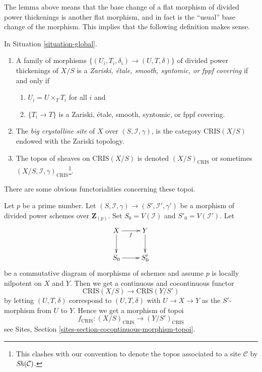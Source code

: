 \noindent
The lemma above means that the base change of a flat morphism
of divided power thickenings is another flat morphism, and in
fact is the ``usual'' base change of the morphism. This implies
that the following definition makes sense.

\begin{definition}
\label{definition-big-crystalline-site}
In Situation \ref{situation-global}.
\begin{enumerate}
\item A family of morphisms $\{(U_i, T_i, \delta_i) \to (U, T, \delta)\}$
of divided power thickenings of $X/S$ is a
{\it Zariski, \'etale, smooth, syntomic, or fppf covering}
if and only if
\begin{enumerate}
\item $U_i = U \times_T T_i$ for all $i$ and
\item $\{T_i \to T\}$ is a Zariski, \'etale, smooth, syntomic, or fppf covering.
\end{enumerate}
\item The {\it big crystalline site} of $X$ over $(S, \mathcal{I}, \gamma)$,
is the category $\text{CRIS}(X/S)$ endowed with the Zariski topology.
\item The topos of sheaves on $\text{CRIS}(X/S)$ is denoted
$(X/S)_{\text{CRIS}}$ or sometimes
$(X/S, \mathcal{I}, \gamma)_{\text{CRIS}}$\footnote{This clashes with
our convention to denote the topos associated to a site $\mathcal{C}$
by $\mathop{\mathit{Sh}}\nolimits(\mathcal{C})$.}.
\end{enumerate}
\end{definition}

\noindent
There are some obvious functorialities concerning these topoi.

\begin{remark}[Functoriality]
\label{remark-functoriality-big-cris}
Let $p$ be a prime number.
Let $(S, \mathcal{I}, \gamma) \to (S', \mathcal{I}', \gamma')$ be a
morphism of divided power schemes over $\mathbf{Z}_{(p)}$.
Set $S_0 = V(\mathcal{I})$ and $S'_0 = V(\mathcal{I}')$.
Let
$$
\xymatrix{
X \ar[r]_f \ar[d] & Y \ar[d] \\
S_0 \ar[r] & S'_0
}
$$
be a commutative diagram of morphisms of schemes and assume $p$ is
locally nilpotent on $X$ and $Y$. Then we get a continuous and
cocontinuous functor
$$
\text{CRIS}(X/S) \longrightarrow \text{CRIS}(Y/S')
$$
by letting $(U, T, \delta)$ correspond to $(U, T, \delta)$
with $U \to X \to Y$ as the $S'$-morphism from $U$ to $Y$.
Hence we get a morphism of topoi
$$
f_{\text{CRIS}} : (X/S)_{\text{CRIS}} \longrightarrow (Y/S')_{\text{CRIS}}
$$
see Sites, Section \ref{sites-section-cocontinuous-morphism-topoi}.
\end{remark}

